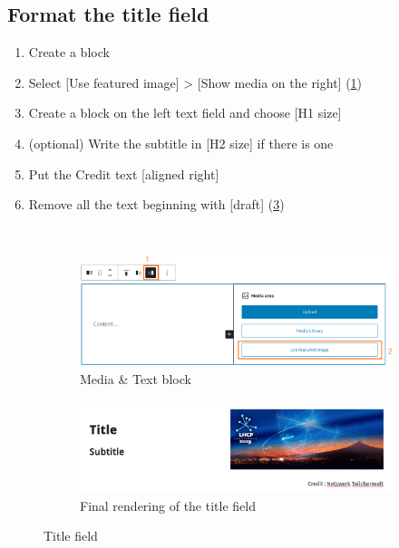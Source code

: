 \newpage
\subsection*{Format the title field}\label{ssec:title}
\begin{enumerate}
    \item Create a block  
    \item Select [Use featured image] > [Show media on the right] (\ref{fig:media_text})
    \item Create a block  on the left text field and choose [H1 size]
    \item (optional) Write the subtitle in [H2 size] if there is one
    \item Put the Credit text [aligned right]
    \item Remove all the text beginning with [draft] (\ref{fig:title_final})
\end{enumerate}
\

\begin{figure}[h]
    \centering
    \begin{subfigure}[b]{\textwidth}
        \includegraphics[width=\linewidth]{Image/Process/media_text.png}
        \caption{Media \& Text block}
        \label{fig:media_text}
    \end{subfigure}
    \bigskip
    \vspace{.1cm}
    \begin{subfigure}[b]{\textwidth}
        \centering
        \includegraphics[width=\linewidth]{Image/Process/title_final.png}
        \caption{Final rendering of the title field}
        \label{fig:title_final}
    \end{subfigure}
    \caption{Title field}
\end{figure}

